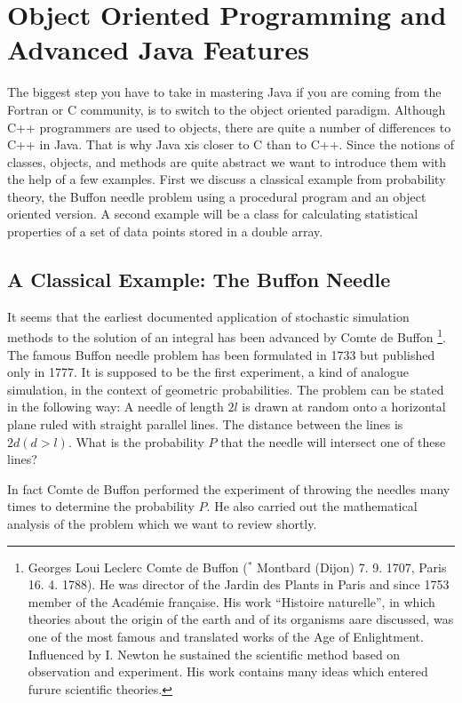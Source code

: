 \chapter{Object Oriented Programming and Advanced Java Features}
\label{sec:objectoriented}

The biggest step you have to take in mastering Java if you are
coming from the Fortran or C community, is to switch to the object
oriented paradigm. Although C++ programmers are used to objects, there
are quite a number of differences to C++ in Java. That is why Java
xis closer to C than to C++. Since the notions of classes, objects, and
methods are quite abstract we want to introduce them with the help of
a few examples. First we discuss a classical example from probability theory,
the Buffon needle problem using a procedural program and an object oriented version.
A second example will be a class for calculating 
statistical properties of a set of data points stored in a double array.  


\section{A Classical Example: The Buffon Needle}

It seems that the earliest documented application of stochastic simulation
methods to the solution of an integral has been advanced by Comte de
Buffon \footnote{Georges Loui Leclerc Comte de Buffon ($^*$ Montbard
  (Dijon) 7. 9. 1707, \dag Paris 16. 4. 1788). He was director of the
  Jardin des Plants in Paris and since 1753 member of the Acad\'emie 
fran\c{c}aise. His  work ``Histoire naturelle'', in which theories
about the origin of the earth and of  its organisms aare discussed,
was one of the most famous and translated works of the Age of
Enlightment. Influenced by I. Newton he sustained the scientific
method based on observation and experiment. His work contains many
ideas which entered furure scientific theories.}. The famous Buffon
needle problem has been formulated in 1733 but published only in 1777. It is
supposed
to be the first experiment, a kind of analogue simulation, in the
context of geometric probabilities. The problem can be stated in the
following way: A needle of length $2l$ is drawn at random onto a
horizontal plane ruled with straight parallel lines. The distance
between the lines is $2d (d>l)$. 
What is the probability $P$ that the
needle will intersect one of these lines?

In fact Comte de Buffon performed the experiment of throwing the
needles many times to determine the probability $P$. He also carried
out the mathematical analysis of the problem which we want to review
shortly.

